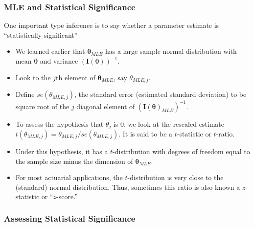 \documentclass[]{book}
\begin{document}
\subsubsection{MLE and Statistical
Significance}\label{mle-and-statistical-significance}

One important type inference is to say whether a parameter estimate is
``statistically significant''

\begin{itemize}
\item
  We learned earlier that \(\boldsymbol \theta_{MLE}\) has a large
  sample normal distribution with mean \(\boldsymbol \theta\) and
  variance \(\left( \mathbf{I}(\boldsymbol \theta) \right)^{-1}\).
\item
  Look to the \(j\)th element of \(\boldsymbol \theta_{MLE}\), say
  \(\theta_{MLE,j}\).
\item
  Define \(se(\theta_{MLE,j})\), the standard error (estimated standard
  deviation) to be square root of the \(j\) diagonal element of
  \(\left( \mathbf{I}(\boldsymbol \theta)_{MLE} \right)^{-1}\).
\item
  To assess the hypothesis that \(\theta_j\) is 0, we look at the
  rescaled estimate
  \(t(\theta_{MLE,j})=\theta_{MLE,j}/se(\theta_{MLE,j})\). It is said to
  be a \(t\)-statistic or \(t\)-ratio.
\item
  Under this hypothesis, it has a \(t\)-distribution with degrees of
  freedom equal to the sample size minus the dimension of
  \(\boldsymbol \theta_{MLE}\).
\item
  For most actuarial applications, the \(t\)-distribution is very close
  to the (standard) normal distribution. Thus, sometimes this ratio is
  also known a \(z\)-statistic or ``\(z\)-score.''
\end{itemize}

\subsubsection{Assessing Statistical
Significance}\label{assessing-statistical-significance}
\end{document}
